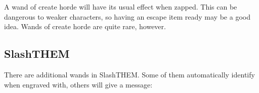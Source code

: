 A wand of create horde\footnotemark[191] will have its usual effect when zapped. This can be dangerous to weaker characters, so having an escape item\footnotemark[192] ready may be a good idea. Wands of create horde are quite rare, however.



\subsection{SlashTHEM}
\label{21}
There are additional wands in SlashTHEM\footnotemark[193]. Some of them automatically identify when engraved with, others will give a message:




